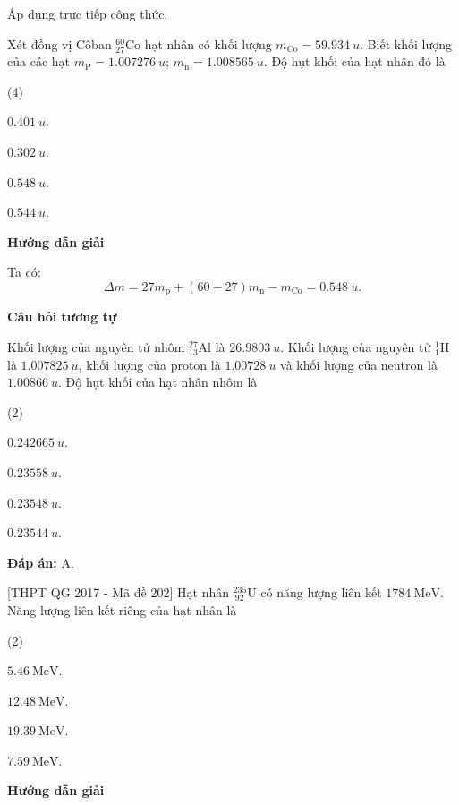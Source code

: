 \begin{dang}{Áp dụng trực tiếp công thức.}


{
Xét đồng vị Côban $ ^{60}_{27} \text{Co} $ hạt nhân có khối lượng $ m_{\text{Co}} = \SI{59,934}{u}$. Biết khối lượng của các hạt $ m_{\text{P}} = \SI{1,007276}{u} $; $ m_{\text{n}} = \SI{1,008565}{u} $. Độ hụt khối của hạt nhân đó là
\begin{mcq}(4)
	\item $ \SI{0,401}{u} $.
	\item $ \SI{0,302}{u} $.
	\item $ \SI{0,548}{u} $.
	\item $ \SI{0,544}{u} $.
\end{mcq} 
}
{
\begin{center}
	\textbf{Hướng dẫn giải}
\end{center}
Ta có:
$$
	\Delta m = 27 m_{\text{p}} + (60 - 27) m_{\text{n}} - m_{\text{Co}} = \SI{0,548}{u}.
$$

\begin{center}
	\textbf{Câu hỏi tương tự}
\end{center}
Khối lượng của nguyên tử nhôm $ ^{27}_{13} \text{Al} $ là $ \SI{26,9803}{u} $. Khối lượng của nguyên tử $ ^{1}_{1} \text{H} $ là $ \SI{1,007825}{u} $, khối lượng của proton là $ \SI{1,00728}{u} $ và khối lượng của neutron là $ \SI{1,00866}{u} $. Độ hụt khối của hạt nhân nhôm là
\begin{mcq}(2)
	\item $ \SI{0,242665}{u} $.
	\item $ \SI{0,23558}{u} $.
	\item $ \SI{0,23548}{u} $.
	\item $ \SI{0,23544}{u} $.
\end{mcq}
\textbf{Đáp án:} A.
}

{	[THPT QG 2017 - Mã đề 202]  Hạt nhân $^{235}_{\ 92}\text{U}$ có năng lượng liên kết $\SI{1784}{\mega\electronvolt}$. Năng lượng liên kết riêng của hạt nhân là
	\begin{mcq}(2)
		\item $\SI{5,46}{\mega\electronvolt}$.
		\item $\SI{12,48}{\mega\electronvolt}$.
		\item $\SI{19,39}{\mega\electronvolt}$.
		\item $\SI{7,59}{\mega\electronvolt}$.
	\end{mcq}}
{
	\begin{center}
		\textbf{Hướng dẫn giải}
	\end{center}

}
\end{dang}
